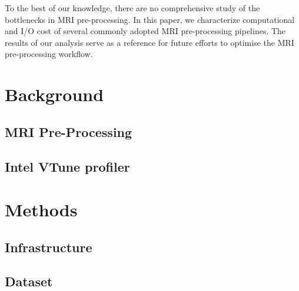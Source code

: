 \documentclass[conference]{IEEEtran}
\begin{document}
To the best of our knowledge, there are no comprehensive study of the
bottlenecks in MRI pre-processing.
In this paper, we characterize computational and I/O cost of several commonly
adopted MRI pre-processing pipelines.
The results of our analysis serve as a reference for future efforts to optimise
the MRI pre-processing workflow.

\section{Background}

\subsection{MRI Pre-Processing}







\subsection{Intel VTune profiler}





\section{Methods}
\subsection{Infrastructure}

\subsection{Dataset}
\end{document}
